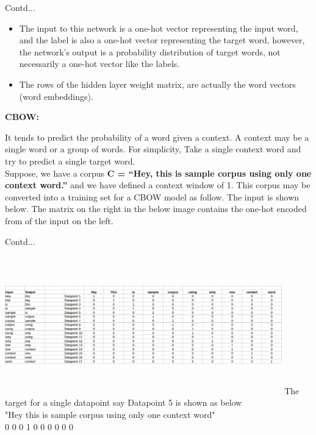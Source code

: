 \documentclass{beamer}
\newcommand\myheading[1]{%
  \par\bigskip
  {\Large\bfseries#1}\par\smallskip}
\begin{document}
\begin{frame}{Contd...}
\begin{flushleft}
\begin{itemize}
	\item The input to this network is a one-hot vector representing the input word, and the label is also a one-hot vector representing the target word, however, the network’s output is a probability distribution of target words, not necessarily a one-hot vector like the labels.
	\item The rows of the hidden layer weight matrix, are actually the word vectors (word embeddings).
\end{itemize}
\myheading{CBOW:}
It tends to predict the probability of a word given a context. A context may be a single word or a group of words. For simplicity, Take a single context word and try to predict a single target word.\\
\vspace{5pt}
Suppose, we have a corpus \textbf{C = “Hey, this is sample corpus using only one context word.”} and we have defined a context window of 1. This corpus may be converted into a training set for a CBOW model as follow. The input is shown below. The matrix on the right in the below image contains the one-hot encoded from of the input on the left.
	\end{flushleft}
\end{frame}
\begin{frame}{Contd...}
\begin{flushleft}
\includegraphics[height=6cm, width=12cm]{cbow1}
	 The target for a single datapoint say Datapoint 5 is shown as below\\
"Hey	this	is	sample	corpus	using	only	one	context	word"\\
0	0	0	1	0	0	0	0	0	0
	\end{flushleft}
\end{frame}
\end{document}
